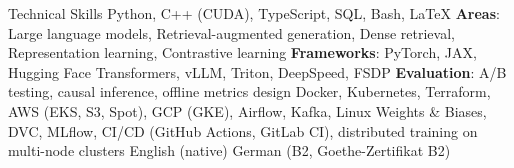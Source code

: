 
\begin{rubric}{Technical Skills}
	Python, C++ (CUDA), TypeScript, SQL, Bash, \LaTeX
{}
	\textbf{Areas}: Large language models, Retrieval-augmented generation, Dense retrieval, Representation learning, Contrastive learning \newline
	\textbf{Frameworks}: PyTorch, JAX, Hugging Face Transformers, vLLM, Triton, DeepSpeed, FSDP \newline
	\textbf{Evaluation}: A/B testing, causal inference, offline metrics design
	Docker, Kubernetes, Terraform, AWS (EKS, S3, Spot), GCP (GKE), Airflow, Kafka, Linux
	Weights \& Biases, DVC, MLflow, CI/CD (GitHub Actions, GitLab CI), distributed training on multi-node clusters
\entry*[Languages]
	English (native) \newline
	German (B2, Goethe-Zertifikat B2)
\end{rubric}
